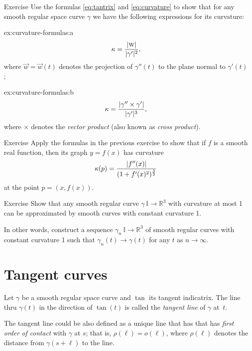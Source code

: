 \begin{thm}{Exercise}\label{ex:curvature-formulas}
Use the formulas \ref{eq:tantrix} and \ref{eq:curvature} to show that 
for any smooth regular space curve $\gamma$ we have the following expressions for its curvature:

\begin{subthm}{ex:curvature-formulas:a} 
\[\kappa=\frac{|\text{\sc{w}}|}{|\gamma'|^2},\]
where $\vec w=\vec w(t)$ denotes the projection of $\gamma''(t)$ to the plane normal to $\gamma'(t)$;
\end{subthm}

\begin{subthm}{ex:curvature-formulas:b}
\[\kappa=\frac{|\gamma''\times \gamma'|}{|\gamma'|^{3}},\]
where $\times$ denotes the \emph{vector product} (also known as \emph{cross product}).
\end{subthm}

\end{thm}


\begin{thm}{Exercise}\label{ex:curvature-graph}
Apply the formulas in the previous exercise to show that if $f$ is a smooth real function,
then its graph $y=f(x)$  has curvature
\[\kappa(p)=\frac{|f''(x)|}{(1+f'(x)^2)^{\frac32}}\]
at the point $p=(x,f(x))$.
\end{thm}

\begin{thm}{Exercise}\label{ex:approximation-const-curvature}
Show that any smooth regular curve $\gamma\:\mathbb{I}\to\mathbb{R}^3$ with curvature at most 1 can be approximated by smooth curves with constant curvature 1.

In other words, construct a sequence $\gamma_n\:\mathbb{I}\to\mathbb{R}^3$ of smooth regular curves  with constant curvature 1 such that $\gamma_n(t)\to \gamma(t)$ for any $t$ as $n\to\infty$.
\end{thm}


\section{Tangent curves}

Let $\gamma$ be a smooth regular space curve and $\tan$ its tangent indicatrix.
The line thru $\gamma(t)$ in the direction of $\tan(t)$ is called the \emph{tangent line} of $\gamma$  at~$t$.

The tangent line could be also defined as a unique line that has that has \emph{first order of contact} with $\gamma$ at $s$;
that is, $\rho(\ell)=o(\ell)$, where $\rho(\ell)$ denotes the distance from $\gamma(s+\ell)$ to the line.


